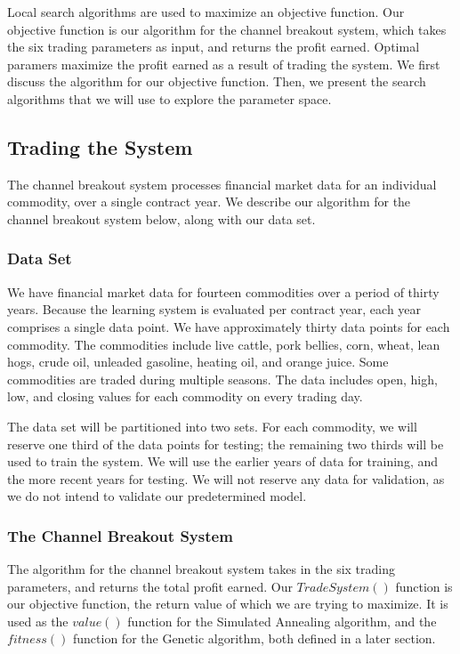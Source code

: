 \documentclass[10pt]{article}
\begin{document}
Local search algorithms are used to maximize an objective function. Our
objective function is our algorithm for the channel breakout system, which
takes the six trading parameters as input, and returns the profit
earned. Optimal paramers maximize the profit earned as a result of trading the
system. We first discuss the algorithm for our objective function. Then, we
present the search algorithms that we will use to explore the parameter space.


\subsection{Trading the System}

The channel breakout system processes financial market data for an individual
commodity, over a single contract year.  We describe our algorithm for the
channel breakout system below, along with our data set.


\subsubsection{Data Set}

We have financial market data for fourteen commodities over a period of thirty
years.  Because the learning system is evaluated per contract year, each year
comprises a single data point.  We have approximately thirty data points for
each commodity.  The commodities include live cattle, pork bellies, corn,
wheat, lean hogs, crude oil, unleaded gasoline, heating oil, and orange juice.
Some commodities are traded during multiple seasons.  The data includes open,
high, low, and closing values for each commodity on every trading day.


The data set will be partitioned into two sets. For each commodity, we will
reserve one third of the data points for testing; the remaining two thirds will
be used to train the system. We will use the earlier years of data for
training, and the more recent years for testing. We will not reserve any data
for validation, as we do not intend to validate our predetermined model.


\subsubsection{The Channel Breakout System}

The algorithm for the channel breakout system takes in the six trading
parameters, and returns the total profit earned. Our $TradeSystem()$ function
is our objective function, the return value of which we are trying to maximize.
It is used as the $value()$ function for the Simulated Annealing algorithm, and
the $fitness()$ function for the Genetic algorithm, both defined in a later
section.
\end{document}
